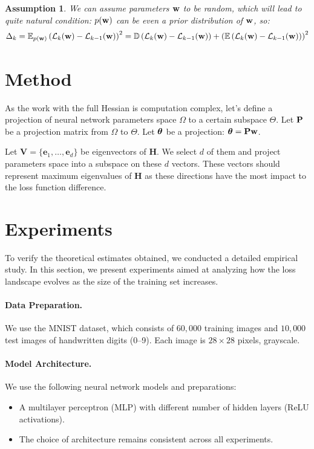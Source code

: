 \documentclass{article}
\newtheorem{assumption}{Assumption}
\begin{document}
\begin{assumption}
  We can assume parameters $\mathbf{w}$ to be random, which will lead to quite natural condition: $p(\mathbf{w})$ can be even a prior
  distribution of $\mathbf{w}$, so:
  $$\Delta_{k} = \mathbb{E}_{p(\mathbf{w})} \left( \mathcal{L}_{k}(\mathbf{w}) - \mathcal{L}_{k-1}(\mathbf{w})
    \right)^2 = \mathbb{D} \left( \mathcal{L}_{k}(\mathbf{w}) - \mathcal{L}_{k-1}(\mathbf{w}) \right) + \left( \mathbb{E} \left(
      \mathcal{L}_{k}(\mathbf{w}) - \mathcal{L}_{k-1}(\mathbf{w}) \right) \right)^2$$
\end{assumption}

\section{Method}\label{sec:method}

As the work with the full Hessian is computation complex, let's define a projection of neural network parameters space
$\Omega$ to a certain subspace $\Theta$. Let $\mathbf{P}$ be a projection matrix from $\Omega$ to $\Theta$. Let $\boldsymbol{\theta}$ be
a projection: $\boldsymbol{\theta} = \mathbf{P}\mathbf{w}$.

Let $\mathbf{V} = \{\mathbf{e}_1, \dots, \mathbf{e}_d\}$ be eigenvectors of $\mathbf{H}$. We select $d$ of them and project parameters space
into a subspace on these $d$ vectors. These vectors should represent maximum eigenvalues of $\mathbf{H}$ as these directions
have the most impact to the loss function difference.
\section{Experiments}\label{sec:exp}

To verify the theoretical estimates obtained, we conducted a detailed empirical study.
In this section, we present experiments aimed at analyzing how the loss landscape evolves as the size of the training
set increases.

\paragraph{Data Preparation.}
We use the MNIST dataset, which consists of $60{,}000$ training images and $10{,}000$ test
images of handwritten digits (0--9). Each image is $28\times28$ pixels, grayscale.

\paragraph{Model Architecture.}
We use the following neural network models and preparations:
\begin{itemize}
  \item A multilayer perceptron (MLP) with different number of hidden layers (ReLU activations).
  \item The choice of architecture remains consistent across all experiments.
\end{itemize}
\end{document}
